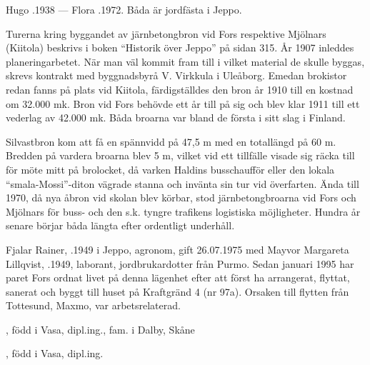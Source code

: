 Hugo .1938  ---  Flora .1972. Båda är jordfästa i Jeppo.




Turerna kring byggandet av järnbetongbron vid Fors respektive Mjölnars (Kiitola) beskrivs i boken ``Historik över Jeppo'' på sidan 315. År 1907 inleddes planeringarbetet. När man väl kommit fram till i vilket material de skulle byggas, skrevs kontrakt med byggnadsbyrå V. Virkkula i Uleåborg. Emedan brokistor redan fanns på plats vid Kiitola, färdigställdes den bron år 1910 till en kostnad om 32.000 mk. Bron vid Fors behövde ett år till på sig och blev klar 1911 till ett vederlag av 42.000 mk. Båda broarna var bland de första i sitt slag i Finland.


Silvastbron kom att få en spännvidd på 47,5 m med en totallängd på 60 m. Bredden på vardera broarna blev 5 m, vilket vid ett tillfälle visade sig räcka till för möte mitt på brolocket, då varken Haldins busschaufför eller den lokala ``smala-Mossi''-diton vägrade stanna och invänta sin tur vid överfarten. Ända till 1970, då nya åbron vid skolan blev körbar, stod järnbetongbroarna vid Fors och Mjölnars för buss- och den s.k. tyngre trafikens logistiska möjligheter. Hundra år senare börjar båda längta efter ordentligt underhåll.









Fjalar Rainer, .1949 i Jeppo, agronom, gift 26.07.1975 med Mayvor Margareta Lillqvist, .1949, laborant, jordbrukardotter från Purmo. Sedan januari 1995 har paret Fors ordnat livet på denna lägenhet efter att först ha arrangerat, flyttat, sanerat och	byggt till huset på Kraftgränd 4 (nr 97a). Orsaken till flytten från Tottesund, Maxmo, var arbetsrelaterad.
\begin{jhchildren}
  \item {}, född i Vasa, dipl.ing., fam. i Dalby, Skåne
  \item {}, född i Vasa, dipl.ing.
\end{jhchildren}

